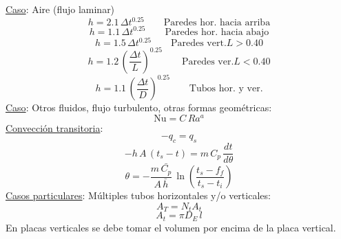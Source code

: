 \documentclass[letter,oneside,10pt]{article}
\begin{document}
\begin{multicols}{3}
\begin{itemize}
\end{itemize}
\scriptsize
\underline{Caso}: Aire (flujo laminar)
\vspace{-0.3cm}
\begin{equation*}
    h = 2.1\,\Delta t^{0.25}\qquad\text{Paredes hor.\ hacia arriba}
\end{equation*}
\begin{equation*}
    h = 1.1\,\Delta t^{0.25}\qquad\text{Paredes hor.\ hacia abajo}
\end{equation*}
\begin{equation*}
    h = 1.5\,\Delta t^{0.25}\qquad\text{Paredes vert.} L > 0.40
\end{equation*}
\begin{equation*}
    h = 1.2\,\left(\frac{\Delta t}{L}\right)^{0.25}
    \qquad\text{Paredes ver.} L < 0.40
\end{equation*}
\begin{equation*}
    h = 1.1\,\left(\frac{\Delta t}{D}\right)^{0.25}
    \qquad\text{Tubos hor.\ y ver.}
\end{equation*}
\underline{Caso}: Otros fluidos, flujo turbulento, otras formas geométricas:
\vspace{-0.3cm}
\begin{equation*}
    \text{Nu} = C\,Ra^a
\end{equation*}
\vspace{-0.3cm}
\underline{Convección transitoria}:
\begin{equation*}
    -q_c = q_s
\end{equation*}
\vspace{-0.4cm}
\begin{equation*}
    -h\,A\,(t_s-t) = m\,C_p\,\frac{dt}{d\theta}
\end{equation*}
\vspace{-0.3cm}
\begin{equation*}
    \theta =
    -\frac{m\,\bar{C_p}}{A\,\bar{h}}\,\ln\left(\frac{t_s-f_f}{t_s-t_i}\right)
\end{equation*}
\underline{Casos particulares}:
Múltiples tubos horizontales y/o verticales:
\vspace{-0.3cm}
\begin{equation*}
    A_T = N_t A_t
\end{equation*}
\vspace{-0.3cm}
\begin{equation*}
    A_t = \pi D_E\,l
\end{equation*}
En placas verticales se debe tomar el volumen por encima de la placa vertical.\\

\end{multicols}
\end{document}
